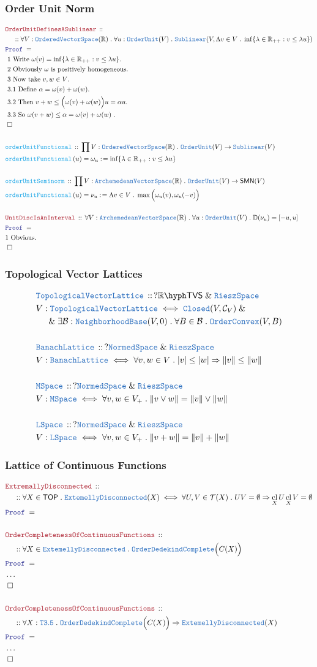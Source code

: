 \documentclass[12pt]{scrartcl}
\newcommand{\TYPE}[1]{\textcolor{NavyBlue}{\mathtt{#1}}}
\newcommand{\FUNC}[1]{\textcolor{Cerulean}{\mathtt{#1}}}
\newcommand{\LOGIC}[1]{\textcolor{Blue}{\mathtt{#1}}}
\newcommand{\THM}[1]{\textcolor{Maroon}{\mathtt{#1}}}
\renewcommand{\.}{\; . \;}
\newcommand{\de}{: \kern 0.1pc =}
\newcommand{\Act}[1]{\left( #1 \right)}
\newcommand{\Theorem}[2]{& \THM{#1} \, :: \, #2 \\ & \Proof = \\ }
\newcommand{\DeclareType}[2]{& \TYPE{#1} \, :: \, #2 \\}
\newcommand{\DefineType}[3]{& #1 : \TYPE{#2} \iff #3 \\}
\newcommand{\DeclareFunc}[2]{& \FUNC{#1} \, :: \, #2 \\}
\newcommand{\DefineNamedFunc}[4]{&  \FUNC{#1}\Act{#2} = #3 \de #4 \\}
\newcommand{\NewLine}{\\ & \kern 1pc}
\newcommand{\Page}[1]{ \begin{align*} #1 \end{align*}   }
\newcommand{\NoProof}{ & \ldots \\ \EndProof}
\newcommand{\Explain}[1]{& \text{#1.} \\}
\renewcommand{\And}{\; \& \;}
\newcommand{\Imply}{\Rightarrow}
\newcommand{\Reals}{\mathbb{R} }
\newcommand{\QED}{\; \square}
\newcommand{\EndProof}{& \QED \\}
\newcommand{\Proof}{\LOGIC{Proof} \; }
\renewcommand{\C}{\mathcal{C}}
\newcommand{\B}{\mathcal{B}}
\newcommand{\NbhdBase}{\TYPE{NeighborhoodBase}}
\newcommand{\Closed}{\TYPE{Closed}}
\newcommand{\ED}{\TYPE{ExtemellyDisconnected}}
\DeclareMathOperator*{\cl}{cl}
\newcommand{\TOP}{\mathsf{TOP}}
\newcommand{\T}{\mathcal{T}}
\newcommand{\Disc}{\mathbb{D}}
\newcommand{\NS}{\TYPE{NormedSpace}}
\newcommand{\OVS}{\TYPE{OrderedVectorSpace}}
\newcommand{\OU}{\TYPE{OrderUnit}}
\newcommand{\AVS}{\TYPE{ArchemedeanVectorSpace}}
\newcommand{\RS}{\TYPE{RieszSpace}}
\newcommand{\OComplete}{\TYPE{OrderDedekindComplete}}
\newcommand{\TVS}[1]{{#1}\hyph\mathsf{TVS}}
\newcommand{\SMN}{\mathsf{SMN}}
\begin{document}
\subsubsection{Order Unit Norm}
\Page{
	\Theorem{OrderUnitDefinesASublinear}
	{
		\NewLine ::		
		\forall V : \OVS(\Reals) \. 
		\forall u : \OU(V) \.
		\TYPE{Sublinear}(V, \Lambda v \in V \. \inf \{ \lambda \in \Reals_{++} : v \le \lambda u \} )
	}
	\Explain{ 1 Write $\omega(v) = \inf \{ \lambda \in \Reals_{++} : v \le \lambda u \}$}
	\Explain{ 2 Obviously $\omega$ is positively homogeneous}
	\Explain{ 3 Now take $v,w \in V$}
	\Explain{ 3.1 Define $\alpha = \omega(v) + \omega(w)$}
	\Explain{ 3.2 Then $ v + w \le \Big(\omega(v) + \omega(w)\Big)u = \alpha u$}
	\Explain{ 3.3 So $\omega(v + w) \le \alpha = \omega(v) + \omega(w)$ }
	\EndProof
	\\
	\DeclareFunc{orderUnitFunctional}
	{
		\prod V : \OVS(\Reals) \. 
		\OU(V) \to \TYPE{Sublinear}(V)
	}
	\DefineNamedFunc{orderUnitFunctional}{u}{\omega_u}
	{\inf \{ \lambda \in \Reals_{++} : v \le \lambda u \}}
	\\
	\DeclareFunc{orderUnitSeminorm}
	{
		\prod V : \AVS(\Reals) \. 
		\OU(V) \to \SMN(V)
	}
	\DefineNamedFunc{orderUnitFunctional}{u}{\nu_u}
	{\Lambda v \in V \. \max\Big(\omega_u(v),\omega_u(-v)\Big)}
	\\
	\Theorem{UnitDiscIsAnInterval}
	{
		\forall V : \AVS(\Reals) \.
		\forall u : \OU(V) \.
		\Disc(\nu_u) = [-u,u] 
	}
	\Explain{1 Obvious}
	\EndProof
}
\newpage
\subsubsection{Topological Vector Lattices}
\Page{
	\DeclareType{TopologicalVectorLattice}
	{
		? \TVS{\Reals} \And \RS
	}
	\DefineType{V}{TopologicalVectorLattice}
	{
		\Closed(V,\C_V) \And \NewLine \And 
		\exists \B : \NbhdBase(V,0) \.
		\forall B \in \B \.
		\TYPE{OrderConvex}(V,B) 
	}
	\\
	\DeclareType{BanachLattice}
	{
		? \NS \And \RS
	}
	\DefineType{V}{BanachLattice}
	{
		\forall v,w \in V \. 
		|v| \le |w| \Imply \|v\| \le \|w\|  
	}
	\\
	\DeclareType{MSpace}
	{
		? \NS \And \RS
	}
	\DefineType{V}{MSpace}
	{
		\forall v,w \in V_+ \. 
		\| v \vee w \| = \|v\| \vee \|w\|
	}
	\\
	\DeclareType{LSpace}
	{
		? \NS \And \RS
	}
	\DefineType{V}{LSpace}
	{
		\forall v,w \in V_+ \. 
		\| v + w \| = \|v\| + \|w\|
	}
}
\newpage
\subsubsection{Lattice of Continuous Functions}
\Page{
	\Theorem{ExtremallyDisconnected}
	{ 
		\NewLine ::		
		\forall X \in \TOP \.
		\ED(X) \iff 
		\forall U,V \in \T(X) \.
		UV = \emptyset 
		\Imply
		\cl_X U \cl_X V = \emptyset 
	}
	\\
	\Theorem{OrderCompletenessOfContinuousFunctions}
	{
		\NewLine ::		
		\forall X \in \ED \. 
		\OComplete\Big( C(X) \Big)
	}
	\NoProof
	\\
	\Theorem{OrderCompletenessOfContinuousFunctions}
	{
		\NewLine ::		
		\forall X : \TYPE{T3.5} \. 
		\OComplete\Big( C(X) \Big)
		\Imply
		\ED(X)
	}
	\NoProof
}
\newpage
\end{document}
